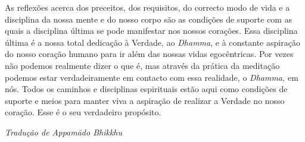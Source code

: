 As reflexões acerca dos preceitos, dos requisitos, do correcto modo de
vida e a disciplina da nossa mente e do nosso corpo são as condições de
suporte com as quais a disciplina última se pode manifestar nos nossos
corações. Essa disciplina última é a nossa total dedicação à Verdade, ao
\emph{Dhamma}, e à constante aspiração do nosso coração humano para ir
além das nossas vidas egocêntricas. Por vezes não podemos realmente
dizer o que é, mas através da prática da meditação podemos estar
verdadeiramente em contacto com essa realidade, o \emph{Dhamma,} em nós.
Todos os caminhos e disciplinas espirituais estão aqui como condições de
suporte e meios para manter viva a aspiração de realizar a Verdade no
nosso coração. Esse é o seu verdadeiro propósito.


\vfill
{\raggedleft\itshape\small
  Tradução de Appamādo Bhikkhu
\par}